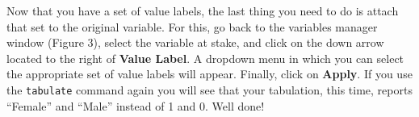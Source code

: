 \documentclass{article}
\begin{document}
Now that you have a set of value labels, the last thing you need to do is attach that set to the original variable. For this, go back to the variables manager window (Figure 3), select the variable at stake, and click on the down arrow located to the right of \textbf{Value Label}. A dropdown menu in which you can select the appropriate set of value labels will appear. Finally, click on \textbf{Apply}. If you use the \texttt{tabulate} command again you will see that your tabulation, this time, reports ``Female'' and ``Male'' instead of 1 and 0. Well done!
\end{document}
